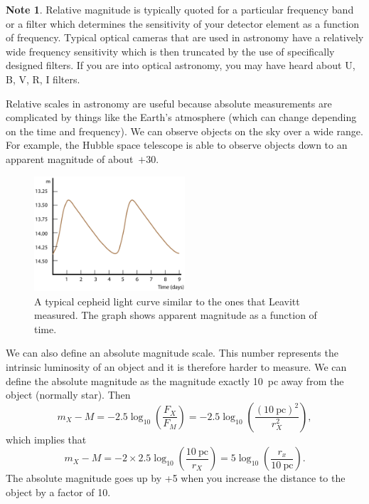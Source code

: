 \documentclass[a4paper,12pt]{article}
\theoremstyle{remark}
\newcommand{\mrm}[1]{\mathrm{#1}}
\renewcommand{\=}[1]{\stackrel{#1}{=}} %
\theoremstyle{plain}
\theoremstyle{definition}
\newtheorem*{definitionT}{Note}%
\newenvironment{note}{
\begin{dBox}
\begin{definitionT}}
{\end{definitionT}
\end{dBox}}
\begin{document}
\begin{note}
Relative magnitude is typically quoted for a particular frequency band or a filter which determines the sensitivity of your detector element as a function of frequency. Typical optical cameras that are used in astronomy have a relatively wide frequency sensitivity which is then truncated by the use of specifically designed filters. If you are into optical astronomy, you may have heard about U, B, V, R, I filters.
\end{note}

Relative scales in astronomy are useful because absolute measurements are complicated by things like the Earth's atmosphere (which can change depending on the time and frequency). We can observe objects on the sky over a wide range. For example, the Hubble space telescope is able to observe objects down to an apparent magnitude of about~$+30$.

\begin{figure}[t]
\begin{center}
    \includegraphics*[angle=0,width=0.5\textwidth]{img/cepheids.png}
    \caption[Insert text]{A typical cepheid light curve similar to the ones that Leavitt measured. The graph shows apparent magnitude as a function of time.}
\label{fig:cepheids}
\end{center}
\end{figure}

We can also define an absolute magnitude scale. This number represents the intrinsic luminosity of an object and it is therefore harder to measure. We can define the absolute magnitude as the magnitude exactly 10~pc away from the object (normally star).  Then
\begin{equation}
m_X - M = -2.5 \log _{10} \left( \frac{F_X}{F_M} \right) = -2.5 \log _{10} \left( \frac{(10 \:\mrm{pc})^{2}}{r^{2}_X} \right),
\end{equation}
which implies that
\begin{equation}
m_X - M = -2 \times 2.5 \log_{10} \left( \frac{10 \:\mrm{pc}}{r_X} \right) = 5 \log _{10} \left( \frac{r_x}{10 \: \mrm{pc}} \right).
\end{equation}
The absolute magnitude goes up by +5 when you increase the distance to the object by a factor of 10.
\end{document}
